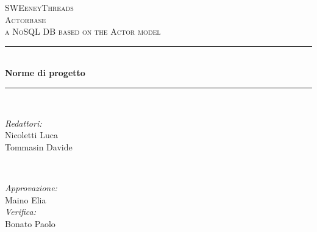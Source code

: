 \documentclass[a4paper]{article}
\begin{document}
	\begin{titlepage}
		\newcommand{\HRule}{\rule{\linewidth}{0.5mm}}
		\center

		\textsc{\LARGE SWEeneyThreads}\\[1.5cm]
		\textsc{\Large Actorbase}\\[0.5cm]
		\textsc{\large a NoSQL DB based on the Actor model}\\[0.5cm]


		\HRule \\[0.4cm]
		{ \huge \bfseries Norme di progetto}\\[0.4cm]
		\HRule \\[1.5cm]

		\begin{minipage}{0.4\textwidth}
			\begin{flushleft} \large
				\emph{Redattori:}\\
				Nicoletti Luca \\
				Tommasin Davide\\
			\end{flushleft}
		\end{minipage}
		~
		\begin{minipage}{0.4\textwidth}
			\begin{flushright} \large
				\emph{Approvazione:} \\
                Maino Elia \\
				\emph{Verifica:} \\
                Bonato Paolo \\
			\end{flushright}
		\end{minipage}


\end{titlepage}
\end{document}
